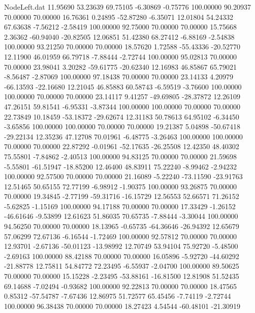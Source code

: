\begin{filecontents}{NodeLeft.dat}
  11.95690   53.23639   69.75105    -6.30869   -0.75776  100.00000   90.20937   70.00000   70.00000   16.76361    0.24895  -52.87280   -6.35071
  12.01804   54.24332   67.63638    -7.56212   -2.58419  100.00000   92.75000   70.00000   70.00000   15.75668    2.36362  -60.94040  -20.82505
  12.06851   51.42380   68.27412    -6.88169   -2.54838  100.00000   93.21250   70.00000   70.00000   18.57620    1.72588  -55.43336  -20.52770
  12.11900   46.01959   66.79718    -7.88444   -2.72744  100.00000   95.02813   70.00000   70.00000   23.98041    3.20282  -59.61775  -20.62340
  12.16983   46.85867   65.79021    -8.56487   -2.87069  100.00000   97.18438   70.00000   70.00000   23.14133    4.20979  -66.13593  -22.16680
  12.21045   46.85883   60.58743    -6.59519   -3.76600  100.00000  100.00000   70.00000   70.00000   23.14117    9.41257  -49.69805  -28.37872
  12.26109   47.26151   59.81541    -6.95331   -3.87344  100.00000  100.00000   70.00000   70.00000   22.73849   10.18459  -53.18372  -29.62674
  12.31183   50.78613   64.95102    -6.34450   -3.65856  100.00000  100.00000   70.00000   70.00000   19.21387    5.04898  -50.67418  -29.22134
  12.35236   47.12708   70.01961    -6.48775   -3.26463  100.00000  100.00000   70.00000   70.00000   22.87292   -0.01961  -52.17635  -26.25508
  12.42350   48.40302   75.55801    -7.84862   -2.40513  100.00000   94.83125   70.00000   70.00000   21.59698   -5.55801  -61.51947  -18.85200
  12.46400   48.83911   75.22240    -8.99462   -2.94232  100.00000   92.57500   70.00000   70.00000   21.16089   -5.22240  -73.11590  -23.91763
  12.51465   50.65155   72.77199    -6.98912   -1.90375  100.00000   93.26875   70.00000   70.00000   19.34845   -2.77199  -59.31716  -16.15729
  12.56553   52.66571   71.26152    -5.62825   -1.15169  100.00000   94.17188   70.00000   70.00000   17.33429   -1.26152  -46.61646   -9.53899
  12.61623   51.86035   70.65735    -7.88444   -3.30044  100.00000   94.56250   70.00000   70.00000   18.13965   -0.65735  -64.36646  -26.94392
  12.65679   57.06299   72.67136    -6.16544   -1.72469  100.00000   92.57812   70.00000   70.00000   12.93701   -2.67136  -50.01123  -13.98992
  12.70749   53.94104   75.92720    -5.48500   -2.69163  100.00000   88.42188   70.00000   70.00000   16.05896   -5.92720  -44.60292  -21.88778
  12.75811   54.84772   72.23495    -6.55937   -2.04700  100.00000   89.50625   70.00000   70.00000   15.15228   -2.23495  -53.88161  -16.81500
  12.81908   51.52435   69.14688    -7.02494   -0.93682  100.00000   92.22813   70.00000   70.00000   18.47565    0.85312  -57.54787   -7.67436
  12.86975   51.72577   65.45456    -7.74119   -2.72744  100.00000   96.38438   70.00000   70.00000   18.27423    4.54544  -60.48101  -21.30919

\end{filecontents}
